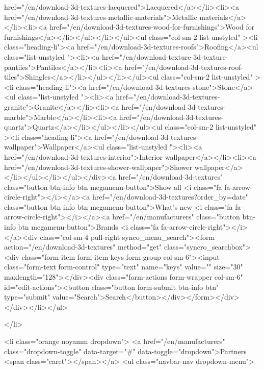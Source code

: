 href="/en/download-3d-textures-lacquered">Lacquered</a></li><li><a href="/en/download-3d-textures-metallic-materials">Metallic materials</a></li><li><a href="/en/download-3d-textures-wood-for-furnishings">Wood for furnishings</a></li></ul></li></ul><ul class="col-sm-2 list-unstyled" ><li class="heading-li"><a href="/en/download-3d-textures-roofs">Roofing</a><ul class="list-unstyled "><li><a href="/en/download-texture-3d-texture-pantiles">Pantiles</a></li><li><a href="/en/download-3d-textures-roof-tiles">Shingles</a></li></ul></li></ul><ul class="col-sm-2 list-unstyled" ><li class="heading-li"><a href="/en/download-3d-textures-stone">Stone</a><ul class="list-unstyled "><li><a href="/en/download-3d-textures-granite">Granite</a></li><li><a href="/en/download-3d-textures-marble">Marble</a></li><li><a href="/en/download-3d-textures-quartz">Quartz</a></li></ul></li></ul><ul class="col-sm-2 list-unstyled" ><li class="heading-li"><a href="/en/download-3d-textures-wallpaper">Wallpaper</a><ul class="list-unstyled "><li><a href="/en/download-3d-textures-interior">Interior wallpaper</a></li><li><a href="/en/download-3d-textures-shower-wallpaper">Shower wallpaper</a></li></ul></li></ul></div><a href="/en/download-3d-textures" class="button btn-info btn megamenu-button">Show all <i class="fa fa-arrow-circle-right"></i></a><a href="/en/download-3d-textures?order_by=date" class="button btn-info btn megamenu-button">What's new <i class="fa fa-arrow-circle-right"></i></a><a href="/en/manufacturers" class="button btn-info btn megamenu-button">Brands <i class="fa fa-arrow-circle-right"></i></a><div class="col-sm-4 pull-right synco_menu_search"><form action="/en/download-3d-textures" method="get" class="syncro_searchbox"><div class="form-item form-item-keys form-group col-sm-6"><input class="form-text form-control" type="text" name="keys" value="" size="30" maxlength="128"></div><div class="form-actions form-wrapper col-sm-6" id="edit-actions"><button class="button form-submit btn-info btn" type="submit" value="Search">Search</button></div></form></div></div></li></ul>
          
            </li>
        
                   
            
      
            
    

                   
        <li class="orange noyamm dropdown">
        <a href="/en/manufacturers" class="dropdown-toggle" data-target="#" data-toggle="dropdown">Partners <span class="caret"></span></a>
                                  <ul class="navbar-nav dropdown-menu">
            
